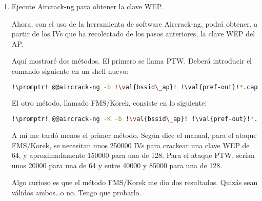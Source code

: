 \begin{enumerate}
  \item Ejecute Aircrack-ng para obtener la clave WEP.

    Ahora, con el uso de la herramienta de software Aircrack-ng, podrá obtener, a partir de los IVs que ha
    recolectado de los pasos anteriores, la clave WEP del AP.

    Aquí mostraré dos métodos. El primero se llama PTW. Deberá introducir el comando siguiente en un shell
    nuevo:

    \begin{lstlisting}[gobble=6,language=bash,style=bashinteract,escapechar=!]
      !\promptr! @@aircrack-ng -b !\val{bssid\_ap}! !\val{pref-out}!*.cap@@
    \end{lstlisting}

    El otro método, llamado FMS/Korek, consiste en lo siguiente:

    \begin{lstlisting}[gobble=6,language=bash,style=bashinteract,escapechar=!]
      !\promptr! @@aircrack-ng -K -b !\val{bssid\_ap}! !\val{pref-out}!*.cap@@
    \end{lstlisting}

    A mí me tardó menos el primer método. Según dice el manual, para el ataque FMS/Korek, se necesitan unos
    \num{250000} IVs para crackear una clave WEP de \SI{64}{\bit}, y aproximadamente \num{150000} para una de
    \SI{128}{\bit}. Para el ataque PTW, serían unos \num{20000} para una de \SI{64}{\bit} y entre \num{40000} y
    \num{85000} para una de \SI{128}{\bit}.

    Algo curioso es que el método FMS/Korek me dio dos resultados. Quizás sean válidos ambos\ldots o no. Tengo
    que probarlo.

\end{enumerate}

